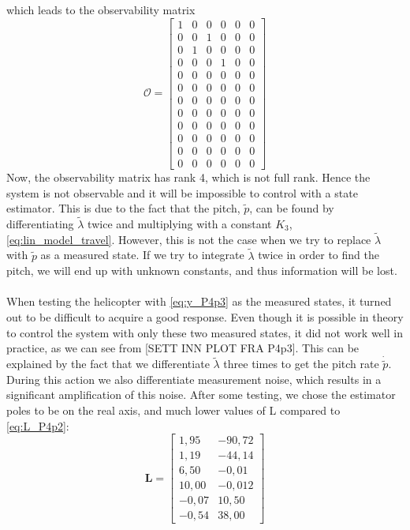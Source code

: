 which leads to the observability matrix
\begin{equation}\nonumber
    \mathcal {O}=
    {\begin{bmatrix}
        1 & 0 & 0 & 0 & 0 & 0\\
        0 & 0 & 1 & 0 & 0 & 0\\
        0 & 1 & 0 & 0 & 0 & 0\\
        0 & 0 & 0 & 1 & 0 & 0\\
        0 & 0 & 0 & 0 & 0 & 0\\
        0 & 0 & 0 & 0 & 0 & 0\\
        0 & 0 & 0 & 0 & 0 & 0\\
        0 & 0 & 0 & 0 & 0 & 0\\
        0 & 0 & 0 & 0 & 0 & 0\\
        0 & 0 & 0 & 0 & 0 & 0\\
        0 & 0 & 0 & 0 & 0 & 0\\
        0 & 0 & 0 & 0 & 0 & 0
    \end{bmatrix}}
\end{equation}
Now, the observability matrix has rank 4, which is not full rank. Hence the system is not observable and it will be impossible to control with a state estimator. This is due to the fact that the pitch, $\tilde{p}$, can be found by differentiating $\tilde{\lambda}$ twice and multiplying with a constant $K_3$, \eqref{eq:lin_model_travel}. However, this is not the case when we try to replace $\tilde{\lambda}$ with $\tilde{p}$ as a measured state. If we try to integrate $\tilde{\lambda}$ twice in order to find the pitch, we will end up with unknown constants, and thus information will be lost.\\
\\
When testing the helicopter with \eqref{eq:y_P4p3} as the measured states, it turned out to be difficult to acquire a good response. Even though it is possible in theory to control the system with only these two measured states, it did not work well in practice, as we can see from [SETT INN PLOT FRA P4p3]. This can be explained by the fact that we differentiate $\tilde{\lambda}$ three times to get the pitch rate $\dot{\tilde{p}}$. During this action we also differentiate measurement noise, which results in a significant amplification of this noise. After some testing, we chose the estimator poles to be on the real axis, and much lower values of L compared to \eqref{eq:L_P4p2}:
\begin{equation}\nonumber
\mathbf{L} = \begin{bmatrix}
1,95 & -90,72\\
1,19 & -44,14\\
6,50 & -0,01\\
10,00 &	-0,012\\
-0,07 &	10,50\\
-0,54 &	38,00
\end{bmatrix}
\end{equation}
